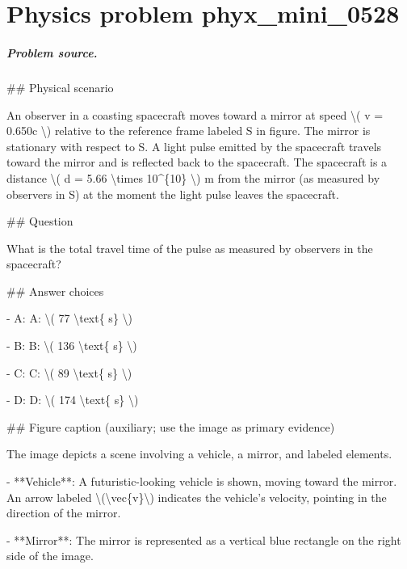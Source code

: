 
\chapter{Physics problem phyx\_mini\_0528}
\label{ch:PhyXMiniProblems_problem_phyx_mini_0528}

\paragraph{Problem source.}
\#\# Physical scenario

An observer in a coasting spacecraft moves toward a mirror at speed \textbackslash{}( v = 0.650c \textbackslash{}) relative to the reference frame labeled S in figure. The mirror is stationary with respect to S. A light pulse emitted by the spacecraft travels toward the mirror and is reflected back to the spacecraft. The spacecraft is a distance \textbackslash{}( d = 5.66 \textbackslash{}times 10\textasciicircum{}\{10\} \textbackslash{}) m from the mirror (as measured by observers in S) at the moment the light pulse leaves the spacecraft.

\#\# Question

What is the total travel time of the pulse as measured by observers in the spacecraft?

\#\# Answer choices

- A: A: \textbackslash{}( 77 \textbackslash{}text\{ s\} \textbackslash{})

- B: B: \textbackslash{}( 136 \textbackslash{}text\{ s\} \textbackslash{})

- C: C: \textbackslash{}( 89 \textbackslash{}text\{ s\} \textbackslash{})

- D: D: \textbackslash{}( 174 \textbackslash{}text\{ s\} \textbackslash{})

\#\# Figure caption (auxiliary; use the image as primary evidence)

The image depicts a scene involving a vehicle, a mirror, and labeled elements. 

- **Vehicle**: A futuristic-looking vehicle is shown, moving toward the mirror. An arrow labeled \textbackslash{}(\textbackslash{}vec\{v\}\textbackslash{}) indicates the vehicle's velocity, pointing in the direction of the mirror.

- **Mirror**: The mirror is represented as a vertical blue rectangle on the right side of the image. 

